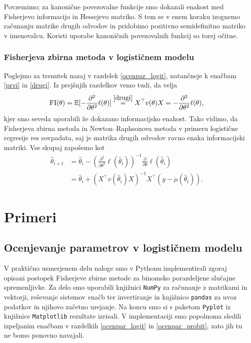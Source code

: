 \documentclass[12pt,a4paper]{amsart}
\theoremstyle{definition} %
\theoremstyle{plain} %
\begin{document}
Povzemimo; za kanonične povezovalne funkcije smo dokazali enakost med Fisherjevo informacijo in Hessejevo matriko. S tem se v enem koraku izognemo računanju matrike drugih 
odvodov in pridobimo pozitivno semidefinitno matriko v imenovalcu. Koristi uporabe kanoničnih povezovalnih funkcij so torej očitne.

\subsubsection{Fisherjeva zbirna metoda  v logističnem modelu}
Poglejmo za trenutek nazaj v razdelek \ref{ocenpar_logit}, natančneje k enačbam \eqref{prvi} in \eqref{drugi}. Iz prejšnjih razdelkov vemo tudi, da velja
\[
    \mathrm{FI}(\theta) = \mathbb{E}[-\frac{\partial^2}{\partial\theta^2} \ell(\theta)] \overset{\eqref{drugi}}{=} X^\top v(\theta)X = -\frac{\partial^2}{\partial\theta^2} \ell(\theta),
\]
kjer smo seveda uporabili že dokazano informacijsko enakost. Tako vidimo, da Fisherjeva zbirna metoda in Newton--Raphsonova metoda v primeru logistične regresije
res sovpadata, saj je matrika drugih odvodov ravno enaka informacijski matriki. Vse skupaj zapošemo kot
\begin{align}
    \hat{\theta}_{i+1} &= \hat{\theta}_{i} - (\frac{\partial^2}{\partial\theta^2} \ell(\hat{\theta}_{i}))^{-1} \frac{\partial}{\partial\theta} \ell(\hat{\theta}_{i}) \nonumber \\
    &= \hat{\theta}_{i} + (X^\top v(\hat{\theta}_{i}) X)^{-1}X^\top(y - \mu(\hat{\theta}_{i})).
\end{align}

\section{Primeri}
\subsection{Ocenjevanje parametrov v logističnem modelu}

V praktično usmerjenem delu naloge smo v Pythonu implementirali zgoraj opisani postopek Fisherjeve zbirne metode za binomsko porazdeljene slučajne
spremenljivke. Za delo smo uporabili knjižnici \texttt{NumPy} za računanje z matrikami in vektorji, reševanje sistemov enačb ter invertiranje in
knjižnico \texttt{pandas} za uvoz podatkov in njihovo začetno urejanje. Na koncu smo si s paketom \texttt{Pyplot} iz knjižnice \texttt{Matplotlib} rezultate izrisali.
V implementaciji smo popolnoma sledili izpeljanim enačbam v razdelkih \ref{ocenpar_logit} in \ref{ocenpar_probit}, zato jih tu ne bomo ponovno navajali.
\end{document}
